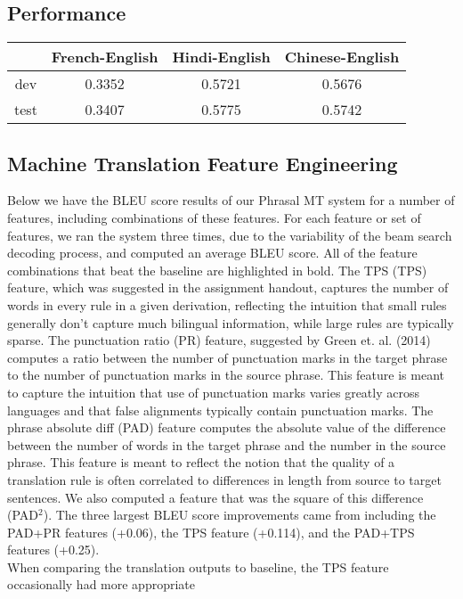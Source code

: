 \documentclass[12pt]{article}
\begin{document}
 \subsection*{Performance}
 	\begin{center}
	 \begin{tabular}{*{4}{c}}
	 	\hline
	 	 & French-English & Hindi-English & Chinese-English  \\
	 	\hline
	 	dev & 0.3352 & 0.5721 & 0.5676 \\
	 	\hline
	 	test & 0.3407 & 0.5775 & 0.5742 
	 \end{tabular}
	 \end{center}
 
 \subsection*{Machine Translation Feature Engineering}
 	Below we have the BLEU score results of our Phrasal MT system for a number of features,
 	including combinations of these features. For each feature or set of features,
 	we ran the system  three times, due to the variability of the beam search
 	decoding process, and computed an average BLEU score. All of the feature 
 	combinations that beat the baseline are highlighted in bold. The TPS (TPS) feature, 
 	which was suggested in the assignment handout, captures the number of words in every rule
 	in a given derivation, reflecting the intuition that small rules generally don't capture much
 	bilingual information, while large rules are typically sparse. The punctuation ratio (PR) feature,
 	suggested by Green et. al. (2014) computes a ratio between the number of punctuation marks 
 	in the target phrase to the number of
 	punctuation marks in the source phrase. This feature is meant to capture the intuition that 
 	use of punctuation marks varies greatly across languages and that false alignments typically
 	contain punctuation marks. The phrase absolute diff (PAD) feature computes the absolute value
 	of the difference between the number of words in the target phrase and the number in the source
 	phrase. This feature is meant to reflect the notion that the quality of a translation rule is often
 	correlated to differences in length from source to target sentences. We also computed a feature that 
 	was the square of this difference (PAD$^2$). The three largest BLEU score improvements came from 
 	including the PAD+PR features (+0.06), the TPS feature (+0.114), and the PAD+TPS features (+0.25).\\
 	When comparing the translation outputs to baseline, the TPS feature occasionally had more appropriate
\end{document}
